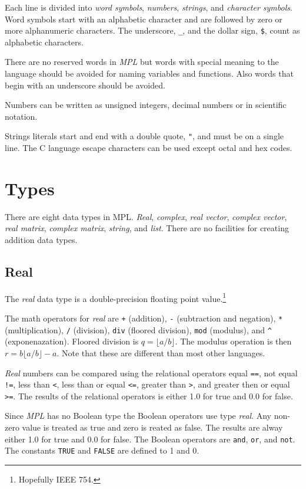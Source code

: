 \documentclass{article}
\begin{document}
Each line is divided into \emph{word symbols}, \emph{numbers},
\emph{strings}, and \emph{character symbols}.
Word symbols start with an alphabetic character and are followed by
zero or more alphanumeric characters.
The underscore, \verb|_|, and the dollar sign, \verb|$|, count as
alphabetic characters.

There are no reserved words in \emph{MPL} but words with special meaning
to the language should be avoided for naming variables and functions.
Also words that begin with an underscore should be avoided.

Numbers can be written as unsigned integers, decimal numbers or
in scientific notation.

Strings literals start and end with a double quote, \verb|"|,
and must be on a single line. The C language escape characters
can be used except octal and hex codes.

\section{Types}
There are eight data types in MPL. \emph{Real}, \emph{complex},
\emph{real vector}, \emph{complex vector}, \emph{real matrix}, \emph{complex matrix}, \emph{string}, and \emph{list}. There are no facilities for creating
addition data types.

\subsection{Real}
The \emph{real} data type is a double-precision floating point value.\footnote{Hopefully IEEE 754.}

The math operators for \emph{real} are \verb|+| (addition),
\verb|-| (subtraction and negation), \verb|*| (multiplication),
\verb|/| (division), \verb|div| (floored division), \verb|mod| (modulus),
and \verb|^| (exponenazation).
Floored division is $q = \lfloor a/b \rfloor$.
The modulus operation is then $r = b\lfloor a/b \rfloor - a$.
Note that these are different than most other languages.

\emph{Real} numbers can be compared using the relational operators
equal \verb|==|, not equal \verb|!=|, less than \verb|<|, less than or equal \verb|<=|, greater than \verb|>|, and greater then or equal \verb|>=|.  The results of the relational operators is either 1.0 for true and 0.0 for false.

Since \emph{MPL} has no Boolean type the Boolean operators use type \emph{real}.
Any non-zero value is treated as true and zero is reated as false.
The results are alway either 1.0 for true and 0.0 for false.
The Boolean operators are \verb|and|, \verb|or|, and \verb|not|.
The constants \verb|TRUE| and \verb|FALSE| are defined to 1 and 0.
\end{document}
